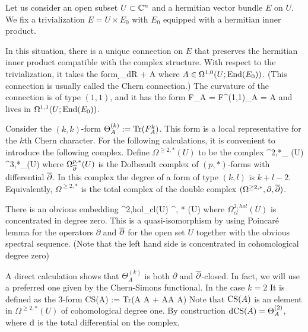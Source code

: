 \def\CS{{\rm CS}}
\def\Tr{{\rm Tr}}

Let us consider an open subset $U \subset \mathbb C^n$ and a hermitian vector
bundle $E$ on $U$. We fix a trivialization $E = U \times E_0$ with $E_0$
equipped with a hermitian inner product. 


In this situation, there is a unique connection on $E$ 
that preserves the hermitian inner product compatible with the complex structure. 
With respect to the trivialization, it takes the form
\ben
\d_{dR} + A 
\een
where $A \in \Omega^{1,0}(U ; {\rm End}(E_0))$. 
(This connection is usually called the Chern connection.)  
The curvature of the connection is of type $(1,1)$, and it has the form
\ben
F_A = F^{(1,1)}_A = \dbar A 
\een
and lives in $\Omega^{1,1}(U ; {\rm End}(E_0))$.

Consider the $(k,k)$-form $\Theta^{(k)}_A := \Tr (F_A^k)$. 
This form is a local representative for the $k$th Chern character. 
For the following calculations, it is convenient to introduce the following complex. 
Define $\Omega^{\geq 2, *} (U)$ to be the complex
\ben
\Omega^{2,*}_{\dbar} (U) \xto{\partial} \Omega^{3,*}_{\dbar}(U) \xto{\partial} \cdots
\een
where $\Omega^{p,*}_{\overline{\partial}} (U)$ is the Dolbeault complex of
$(p,*)$-forms with differential $\overline{\partial}$. In this complex the degree of a form of type
$(k,l)$ is $k+l - 2$. Equivalently, $\Omega^{\geq 2, *}$ is the total complex of the
double complex $(\Omega^{\geq 2, *}, \partial, \overline{\partial})$. 

There is an obvious embedding
\ben
\Omega^{2,hol}_{cl}(U) \hookrightarrow \Omega^{, *} (U)
\een 
where $\Omega^{2,hol}_{cl}(U)$ is concentrated in degree zero. This is a quasi-isomorphism by using Poincar\'e lemma for the operators
$\partial$ and $\overline{\partial}$ for the open set
$U$ together with the obvious spectral sequence. (Note that the left hand side is concentrated in cohomological
degree zero)

A direct calculation shows that $\Theta^{(k)}_A$ is both $\partial$ and
$\overline{\partial}$-closed. In fact, we will use a
preferred one given by the Chern-Simons functional. In the case $k =
2$ It is defined as the $3$-form
\ben
\CS (A) := {\rm Tr}\left(A \wedge \dbar A +  A\wedge A \wedge
  A\right)
\een
Note that $\CS (A)$ is an element in $\Omega^{\geq 2, *} (U)$ of cohomological degree one. 
By construction $\d\CS(A) =\Theta^{(2)}_A$, 
where ${\rm d}$ is the total differential on the complex. 

